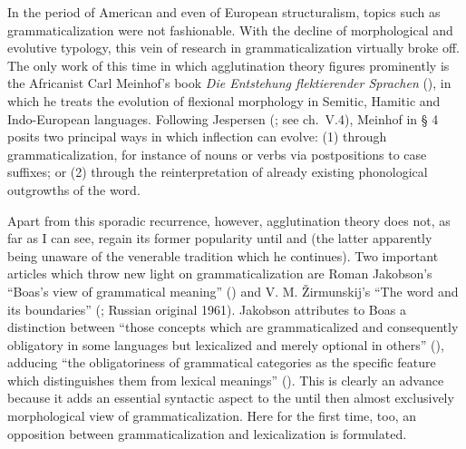 In the period of American and even of European structuralism, topics such as grammaticalization were not fashionable. With the decline of morphological and evolutive typology, this vein of research in grammaticalization virtually broke off. The only work of this time in which agglutination theory figures prominently is the Africanist Carl Meinhof's book \textit{Die Entstehung flektierender Sprachen} (\citeyear{Meinhof1936}), in which he treats the evolution of flexional morphology in Semitic, Hamitic and Indo-European languages. Following Jespersen (\citeyear[375--388]{Jespersen1922}; see ch.~V.4), Meinhof in § 4 posits two principal ways in which inflection can evolve: (1) through grammaticalization, for instance of nouns or verbs via postpositions to case suffixes; or (2) through the reinterpretation of already existing phonological outgrowths of the word.

Apart from this sporadic recurrence, however, agglutination theory does not, as far as I can see, regain its former popularity until \citet{Hodge1970} and \citet{Givón1971} (the latter apparently being unaware of the venerable tradition which he continues). Two important articles which throw new light on grammaticalization are Roman Jakobson's “Boas's view of grammatical meaning” (\citeyear{Jakobson1959}) and V. M. Žirmunskij's “The word and its boundaries” (\citeyear{Žirmunskij1966}; Russian original 1961). Jakobson attributes to Boas a distinction between “those concepts which are grammaticalized and consequently obligatory in some languages but lexicalized and merely optional in others” (\citeyear[492]{Jakobson1959}), adducing “the obligatoriness of grammatical categories as the specific feature which distinguishes them from lexical meanings” \label{quote:Jakobson} (\citeyear[489]{Jakobson1959}). This is clearly an advance because it adds an essential syntactic aspect to the until then almost exclusively morphological view of grammaticalization. Here for the first time, too, an opposition between grammaticalization and lexicalization is formulated.

